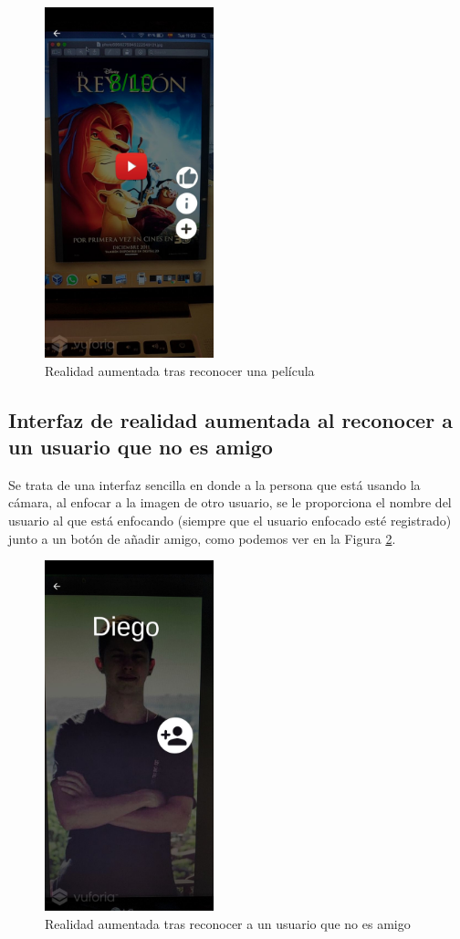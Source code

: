 \begin{figure}[H]
    \centering
    \includegraphics[height=4in]{figures/chapter-3/film-recognized.jpg}
    \caption{Realidad aumentada tras reconocer una película}
    \label{fig:ra_pelicula}
\end{figure}

\subsection{Interfaz de realidad aumentada al reconocer a un usuario que no es amigo}
\label{makereference3.4.5.1}
Se trata de una interfaz sencilla en donde a la persona que está usando la cámara, al enfocar a la imagen de otro usuario, se le proporciona el nombre del usuario al
 que está enfocando (siempre que el usuario enfocado esté registrado) junto a un botón de añadir amigo, como podemos ver en la Figura \ref{fig:ra_usuario}.
\begin{figure}[H]
    \centering
    \includegraphics[height=4in]{figures/chapter-3/usernotFriendrecognized.jpg}
    \caption{Realidad aumentada tras reconocer a un usuario que no es amigo}
    \label{fig:ra_usuario}
\end{figure}
